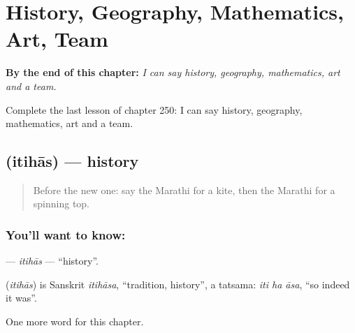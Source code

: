 
\chapter{History, Geography, Mathematics, Art, Team}
\label{ch:mr-history-geography-mathematics-art-team}

\begin{chapteropening}
\textbf{By the end of this chapter:} \emph{I can say history, geography, mathematics, art and a team.}

Complete the last lesson of chapter 250: I can say history, geography, mathematics, art and a team.
\end{chapteropening}

\section[\texorpdfstring{\mr{इतिहास} (itihās)}{इतिहास (itihās)}]{ (itihās) — history}

\label{lesson:MR-C250-itihas}



\begin{quote}
Before the new one: say the Marathi for a kite, then the Marathi for a spinning top.
\end{quote}

\subsection*{You'll want to know: }
\textbf{} — \emph{itihās} — \textquotedblleft{}history\textquotedblright{}.

\begin{cousinweb}
\textbf{} (\emph{itihās}) is Sanskrit \emph{itihāsa}, \textquotedblleft{}tradition, history\textquotedblright{}, a tatsama: \emph{iti ha āsa}, \textquotedblleft{}so indeed it was\textquotedblright{}.
\end{cousinweb}

\begin{grammarlens}[title={What you've built}]
One more word for this chapter.
\end{grammarlens}

